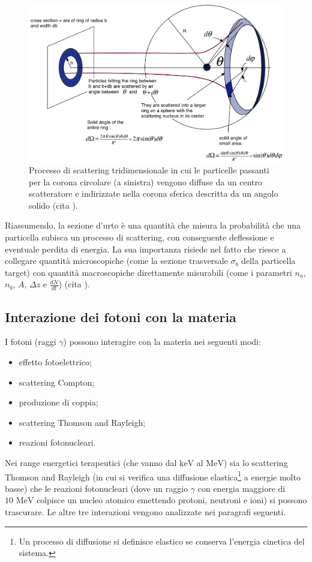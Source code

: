 \documentclass[12pt,a4paper,twoside]{report}
\begin{document}
	\begin{figure}[H]
		\centering
		\includegraphics[width=0.9\linewidth]{solid_angle.png}
		\caption{Processo di scattering tridimensionale in cui le particelle passanti per la corona circolare (a sinistra) vengono diffuse da un centro scatteratore e indirizzate nella corona sferica descritta da un angolo solido (cita
			).}
		\label{fig:solid_angle}
	\end{figure}
	
	Riassumendo, la sezione d'urto è una quantità che misura la probabilità che una particella subisca un processo di scattering, con conseguente deflessione e eventuale perdita di energia. La sua importanza risiede nel fatto che riesce a collegare quantità microscopiche (come la sezione trasversale $\sigma_b$ della particella target) con quantità macroscopiche direttamente misurabili (come i parametri $n_a$, $n_b$, $A$, $\Delta z$ e $\frac{dN}{dt}$) (cita
	).
	
	\subsection{Interazione dei fotoni con la materia}
	I fotoni (raggi $\gamma$) possono interagire con la materia nei seguenti modi:
	\begin{itemize}
		\item effetto fotoelettrico;
		\item scattering Compton;
		\item produzione di coppia;
		\item scattering Thomson and Rayleigh;
		\item reazioni fotonucleari.
	\end{itemize}
	Nei range energetici terapeutici (che vanno dal $\mbox{keV}$ al $\mbox{MeV}$) sia lo scattering Thomson and Rayleigh (in cui si verifica una diffusione elastica\footnote{Un processo di diffusione si definisce elastico se conserva l'energia cinetica del sistema.} a energie molto basse) che le reazioni fotonucleari (dove un raggio $\gamma$ con energia maggiore di $10\mbox{ MeV}$ colpisce un nucleo atomico emettendo protoni, neutroni e ioni) si possono trascurare. Le altre tre interazioni vengono analizzate nei paragrafi seguenti.
	
\end{document}
